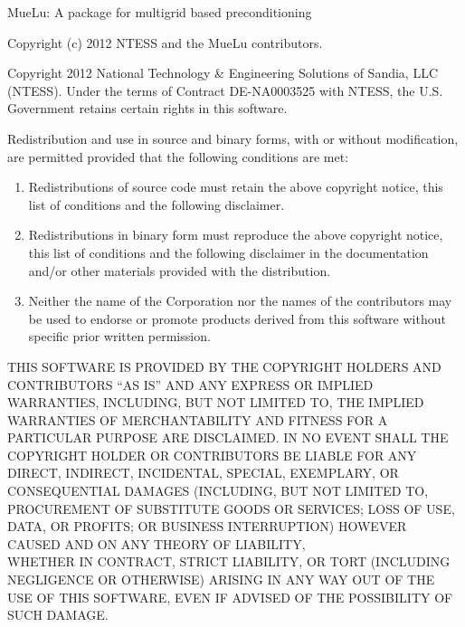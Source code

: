 \label{sec:license}
\begin{center}
MueLu: A package for multigrid based preconditioning

Copyright (c) 2012 NTESS and the MueLu contributors.
\end{center}

\noindent
Copyright 2012 National Technology \& Engineering Solutions of Sandia,
LLC (NTESS). Under the terms of Contract DE-NA0003525 with NTESS, the
U.S. Government retains certain rights in this software.

\noindent
Redistribution and use in source and binary forms, with or without
modification, are permitted provided that the following conditions are
met:

\begin{enumerate}
  \item Redistributions of source code must retain the above copyright
    notice, this list of conditions and the following disclaimer.

  \item Redistributions in binary form must reproduce the above copyright
    notice, this list of conditions and the following disclaimer in the
    documentation and/or other materials provided with the distribution.

  \item Neither the name of the Corporation nor the names of the
    contributors may be used to endorse or promote products derived from
    this software without specific prior written permission.
\end{enumerate}

\noindent
THIS SOFTWARE IS PROVIDED BY THE COPYRIGHT HOLDERS AND CONTRIBUTORS
``AS IS'' AND ANY EXPRESS OR IMPLIED WARRANTIES, INCLUDING, BUT NOT
LIMITED TO, THE IMPLIED WARRANTIES OF MERCHANTABILITY AND FITNESS
FOR A PARTICULAR PURPOSE ARE DISCLAIMED\@. IN NO EVENT SHALL THE
COPYRIGHT HOLDER OR CONTRIBUTORS BE LIABLE FOR ANY DIRECT, INDIRECT,
INCIDENTAL, SPECIAL, EXEMPLARY, OR CONSEQUENTIAL DAMAGES (INCLUDING,
BUT NOT LIMITED TO, PROCUREMENT OF SUBSTITUTE GOODS OR SERVICES\@;
LOSS OF USE, DATA, OR PROFITS\@; OR BUSINESS INTERRUPTION) HOWEVER
CAUSED AND ON ANY THEORY OF LIABILITY, \\WHETHER IN CONTRACT, STRICT
LIABILITY, OR TORT (INCLUDING NEGLIGENCE OR OTHERWISE) ARISING IN
ANY WAY OUT OF THE USE OF THIS SOFTWARE, EVEN IF ADVISED OF THE
POSSIBILITY OF SUCH DAMAGE\@.



